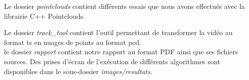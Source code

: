\vspace{10pt}

Le dossier \textit{pointclouds} contient différents essais que nous avons effectués avec la librairie C++ Pointclouds. \\


\vspace{10pt}

Le dossier \textit{track\_tool} contient l'outil permettant de transformer la vidéo au format ts en nuages de points au format pcd.\\

le dossier \textit{rapport} contient notre rapport au format PDF ainsi que ses fichiers sources. Des prises d'écran de l'exécution de différents algorithmes sont disponibles dans le sous-dossier \textit{images/resultats}.\\

